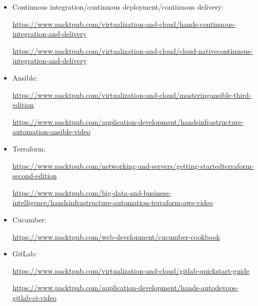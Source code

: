 \begin{itemize}
\item
Continuous integration/continuous deployment/continuous delivery:

\url{https://www.packtpub.com/virtualization-and-cloud/hands-continuous-integration-and-delivery}

\url{https://www.packtpub.com/virtualization-and-cloud/cloud-nativecontinuous-integration-and-delivery}

\item
Ansible:

\url{https://www.packtpub.com/virtualization-and-cloud/masteringansible-third-edition}

\url{https://www.packtpub.com/application-development/handsinfrastructure-automation-ansible-video}

\item
Terraform:

\url{https://www.packtpub.com/networking-and-servers/getting-startedterraform-second-edition}

\url{https://www.packtpub.com/big-data-and-business-intelligence/handsinfrastructure-automation-terraform-aws-video}

\item
Cucumber:

\url{https://www.packtpub.com/web-development/cucumber-cookbook}

\item
GitLab:

\url{https://www.packtpub.com/virtualization-and-cloud/gitlab-quickstart-guide}

\url{https://www.packtpub.com/application-development/hands-autodevops-gitlab-ci-video}
\end{itemize}